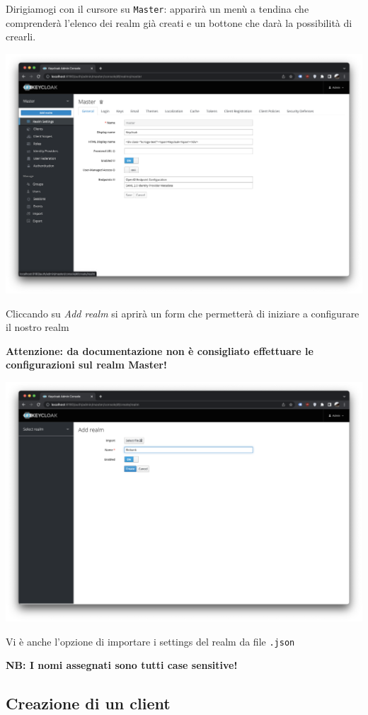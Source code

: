 \documentclass{article}
\begin{document}
Dirigiamogi con il cursore su \texttt{Master}: apparirà un menù a tendina che comprenderà l'elenco dei realm già creati e un bottone che darà la possibilità di crearli.

\begin{center}
    \includegraphics[width=0.80\linewidth]{keycloak_03.png}
\end{center}

Cliccando su \textit{Add realm} si aprirà un form che permetterà di iniziare a configurare il nostro realm

\textbf{Attenzione: da documentazione non è consigliato effettuare le configurazioni sul realm Master!}

\begin{center}
    \includegraphics[width=0.80\linewidth]{keycloak_04.png}
\end{center}

Vi è anche l'opzione di importare i settings del realm da file \texttt{.json}

\textbf{NB: I nomi assegnati sono tutti case sensitive!}

\subsection{Creazione di un client}
\end{document}
